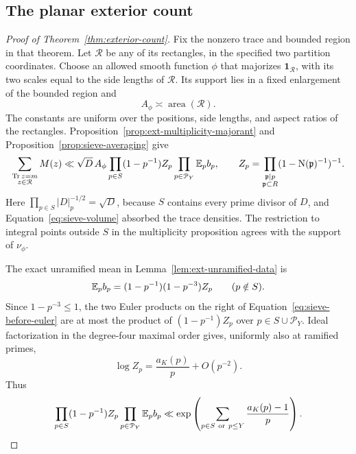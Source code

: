 \subsection{The planar exterior count}

\begin{proof}[Proof of Theorem~\ref{thm:exterior-count}]
Fix the nonzero trace and bounded region in that theorem.  Let
$\mathcal R$ be any of its rectangles, in the specified two partition
coordinates.  Choose an allowed smooth function $\phi$ that majorizes
$\mathbf 1_{\mathcal R}$, with its two scales equal to the side lengths
of $\mathcal R$.  Its support lies in a fixed enlargement of the bounded
region and
\[
 A_\phi\asymp\operatorname{area}(\mathcal R).
\]
The constants are uniform over the positions, side lengths, and aspect
ratios of the rectangles.  Proposition~\ref{prop:ext-multiplicity-majorant}
and Proposition~\ref{prop:sieve-averaging} give
\begin{equation}\label{eq:sieve-before-euler}
 \sum_{\substack{\operatorname{Tr} z=m\\z\in\mathcal R}}M(z)
 \ll \sqrt D\, A_\phi
       \prod_{p\in S}(1-p^{-1})Z_p
       \prod_{p\in\mathcal P_Y}\mathbb E_p b_p,
 \qquad
 Z_p=\prod_{\substack{\mathfrak p\mid p\\\mathfrak p\subset R}}
                (1-\operatorname{N}(\mathfrak p)^{-1})^{-1}.
\end{equation}
Here $\prod_{p\in S}|D|_p^{-1/2}=\sqrt D$, because $S$ contains every
prime divisor of $D$, and Equation~\eqref{eq:sieve-volume} absorbed the
trace densities.  The restriction to integral points outside $S$ in the
multiplicity proposition agrees with the support of $\nu_\phi$.

The exact unramified mean in Lemma~\ref{lem:ext-unramified-data} is
\[
 \mathbb E_p b_p=(1-p^{-1})(1-p^{-3})Z_p\qquad(p\notin S).
\]
Since $1-p^{-3}\le1$, the two Euler products on the right of
Equation~\eqref{eq:sieve-before-euler} are at most the product of
$(1-p^{-1})Z_p$ over $p\in S\cup\mathcal P_Y$.
Ideal factorization in the degree-four maximal order gives, uniformly
also at ramified primes,
\[
 \log Z_p=\frac{a_K(p)}p+O(p^{-2}).
\]
Thus
\begin{equation}\label{eq:sieve-euler}
 \prod_{p\in S}(1-p^{-1})Z_p
       \prod_{p\in\mathcal P_Y}\mathbb E_p b_p
 \ll
 \exp\left(\sum_{p\in S\ \mathrm{or}\ p\le Y}
                    \frac{a_K(p)-1}{p}\right).
\end{equation}


\end{proof}

